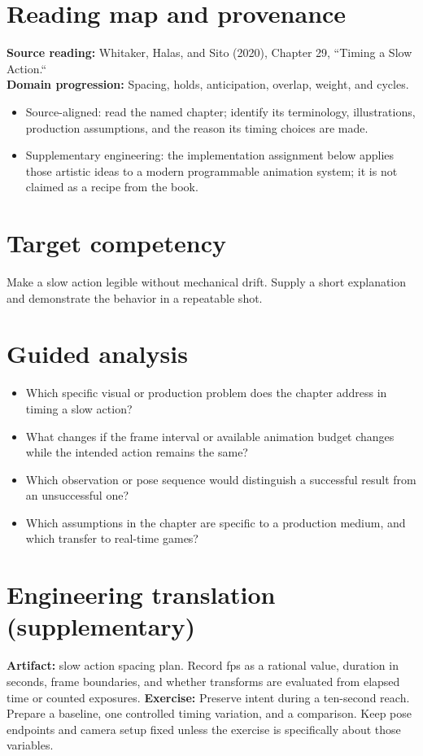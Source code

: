 \documentclass[10pt,letterpaper]{article}
\begin{document}
\makedoctitle
\makedocsummary

\section{Reading map and provenance}
\textbf{Source reading:} Whitaker, Halas, and Sito (2020), Chapter 29, ``Timing a Slow Action.``\\
\textbf{Domain progression:} Spacing, holds, anticipation, overlap, weight, and cycles.
\begin{itemize}
\item Source-aligned: read the named chapter; identify its terminology, illustrations, production assumptions, and the reason its timing choices are made.
\item Supplementary engineering: the implementation assignment below applies those artistic ideas to a modern programmable animation system; it is not claimed as a recipe from the book.
\end{itemize}
\section{Target competency}
Make a slow action legible without mechanical drift. Supply a short explanation and demonstrate the behavior in a repeatable shot.
\section{Guided analysis}
\begin{itemize}
\item Which specific visual or production problem does the chapter address in timing a slow action?
\item What changes if the frame interval or available animation budget changes while the intended action remains the same?
\item Which observation or pose sequence would distinguish a successful result from an unsuccessful one?
\item Which assumptions in the chapter are specific to a production medium, and which transfer to real-time games?
\end{itemize}
\section{Engineering translation (supplementary)}
\textbf{Artifact:} slow action spacing plan. Record fps as a rational value, duration in seconds, frame boundaries, and whether transforms are evaluated from elapsed time or counted exposures.
\textbf{Exercise:} Preserve intent during a ten-second reach. Prepare a baseline, one controlled timing variation, and a comparison. Keep pose endpoints and camera setup fixed unless the exercise is specifically about those variables.
\end{document}
